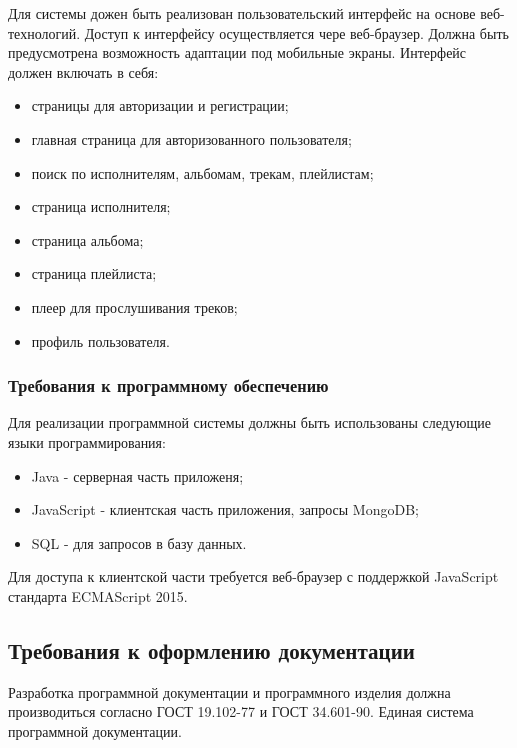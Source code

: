 Для системы дожен быть реализован пользовательский интерфейс на основе веб-технологий\cite{jshtml}\cite{ui2}. Доступ к интерфейсу осуществляется чере веб-браузер. Должна быть предусмотрена возможность адаптации под мобильные экраны.
Интерфейс должен включать в себя:
\begin{itemize}
	\item страницы для авторизации и регистрации;
	\item главная страница для авторизованного пользователя;
	\item поиск по исполнителям, альбомам, трекам, плейлистам;
	\item страница исполнителя;
	\item страница альбома;
	\item страница плейлиста;
	\item плеер для прослушивания треков;
	\item профиль пользователя.
\end{itemize}

\subsubsection{Требования к программному обеспечению}

Для реализации программной системы должны быть использованы
следующие языки программирования:
\begin{itemize}
	\item Java - серверная часть приложеня;
	\item JavaScript - клиентская часть приложения, запросы MongoDB;
	\item SQL  - для запросов в базу данных.
\end{itemize}
Для доступа к клиентской части требуется веб-браузер с поддержкой JavaScript стандарта ECMAScript 2015.

\subsection{Требования к оформлению документации}

Разработка программной документации и программного изделия должна производиться согласно ГОСТ 19.102-77 и ГОСТ 34.601-90. Единая система программной документации.
